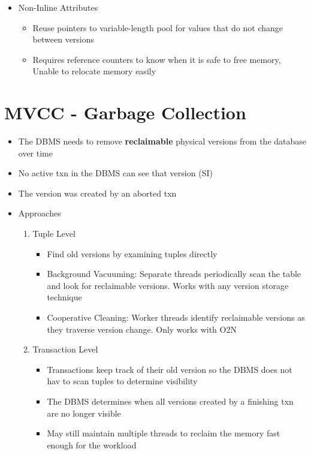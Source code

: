 \documentclass[11pt]{article}
\begin{document}
\begin{itemize}
\begin{enumerate}
\begin{itemize}
        \end{itemize}
    \end{enumerate}
    \item Non-Inline Attributes
    \begin{itemize}
        \item Reuse pointers to variable-length pool for values that do not change between versions
        \item Requires reference counters to know when it is safe to free memory, Unable to relocate memory easily
    \end{itemize}
\end{itemize}

\section{MVCC - Garbage Collection}
\begin{itemize}
    \item The DBMS needs to remove \textbf{reclaimable} physical versions from the database over time
    \item No active txn in the DBMS can see that version (SI)
    \item The version was created by an aborted txn
    \item Approaches
    \begin{enumerate}
        \item Tuple Level
        \begin{itemize}
            \item Find old versions by examining tuples directly
            \item Background Vacuuming: Separate threads periodically scan the table and look for reclaimable versions. Works with any version storage technique
            \item Cooperative Cleaning: Worker threads identify reclaimable versions as they traverse version change. Only works with O2N
        \end{itemize}
        \item Transaction Level
        \begin{itemize}
            \item Transactions keep track of their old version so the DBMS does not hav to scan tuples to determine visibility
            \item The DBMS determines when all versions created by a finishing txn are no longer visible
            \item May still maintain multiple threads to reclaim the memory fast enough for the workload
        \end{itemize}
    \end{enumerate}
\end{itemize}
\end{document}
